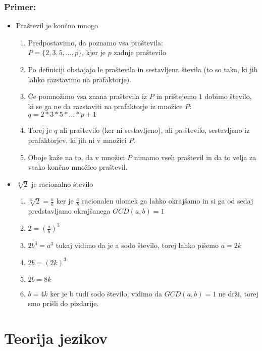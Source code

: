 \documentclass[10pt,a4paper]{article}
\begin{document}
	\subsubsection*{Primer:}
	\begin{itemize}
		\item Praštevil je končno mnogo
			\begin{enumerate}		
				\item Predpostavimo, da poznamo vsa praštevila:\\
					$P = \{2,3,5,...,p\}$, kjer je $p$ zadnje praštevilo 
				\item Po definiciji obstajajo le praštevila in sestavljena števila (to so taka, ki jih 				lahko razstavimo na prafaktorje). 
				\item Če pomnožimo vsa znana praštevila iz $P$ in prištejemo $1$ dobimo število, ki se ga ne da razstaviti na prafaktorje iz množice $P$:\\
					$q = 2 * 3 * 5 * ... * p + 1$
				\item Torej je $q$ ali praštevilo (ker ni sestavljeno), ali pa število, sestavljeno iz prafaktorjev, ki jih ni v množici $P$.
				\item Oboje kaže na to, da v množici $P$ nimamo vseh praštevil in da to velja za vsako končno množico praštevil.
			\end{enumerate}
		\item $\sqrt[3]{2}$ je racionalno število 
			\begin{enumerate}		
				\item  $\sqrt[3]{2} = \frac{a}{b}$ ker je $\frac{a}{b}$ racionalen ulomek ga lahko okrajšamo in si ga od sedaj predstavljamo okrajšanega $GCD(a,b)=1$
				\item $ 2 = \left( \frac{a}{b} \right)^3 $
				\item $2b^3 = a^3$ tukaj vidimo da je a sodo število, torej lahko pišemo $ a = 2k $
				\item $2b = \left( 2k\right)^3 $
				\item $2b = 8k $
				\item $b = 4k $ ker je b tudi sodo število, vidimo da $GCD(a,b)=1$ ne drži, torej smo prišli do pizdarije.
			\end{enumerate}
	\end{itemize}
	


\newpage
\section{Teorija jezikov}
\end{document}
